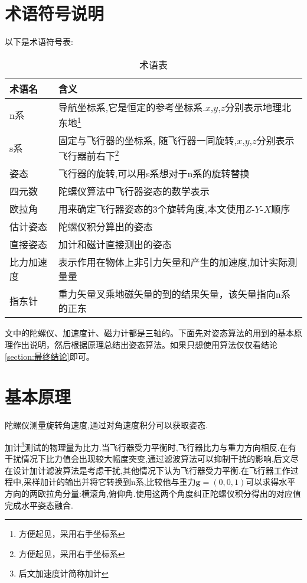 \documentclass[10pt,a4paper]{article}
\begin{document}
\section{术语符号说明} 
以下是术语符号表:
\begin{table}[!hbp]
\begin{center}
    \begin{tabular}{|l|l|}
        \hline
        术语名 & 含义 \\
        \hline
        n系 & 导航坐标系,它是恒定的参考坐标系.$x$,$y$,$z$分别表示地理北东地\footnote{方便起见，采用右手坐标系} \\
        \hline
        s系 & 固定与飞行器的坐标系, 随飞行器一同旋转,$x$,$y$,$z$分别表示飞行器前右下\footnote{方便起见，采用右手坐标系} \\
        \hline
        姿态 & 飞行器的旋转,可以用s系想对于n系的旋转替换 \\
        \hline
        四元数 & 陀螺仪算法中飞行器姿态的数学表示 \\
        \hline
        欧拉角 & 用来确定飞行器姿态的3个旋转角度,本文使用$Z$-$Y$-$X$顺序 \\
        \hline
        估计姿态 & 陀螺仪积分算出的姿态 \\
        \hline
        直接姿态 & 加计和磁计直接测出的姿态 \\
        \hline
        比力加速度 & 表示作用在物体上非引力矢量和产生的加速度,加计实际测量量 \\
        \hline
        指东针 & 重力矢量叉乘地磁矢量的到的结果矢量，该矢量指向n系的正东 \\
        \hline
    \end{tabular}
    \caption{术语表\label{术语表}}
\end{center}
\end{table}

文中的陀螺仪、加速度计、磁力计都是三轴的。下面先对姿态算法的用到的基本原理作出说明，然后根据原理总结出姿态算法。如果只想使用算法仅仅看结论\ref{section:最终结论}即可。
\newpage

\section{基本原理}
陀螺仪测量旋转角速度,通过对角速度积分可以获取姿态.

加计\footnote{后文加速度计简称加计}测试的物理量为比力.当飞行器受力平衡时,飞行器比力与重力方向相反.在有干扰情况下比力值会出现较大幅度突变,通过滤波算法可以抑制干扰的影响,后文尽在设计加计滤波算法是考虑干扰,其他情况下认为飞行器受力平衡.在飞行器工作过程中,采样加计的输出并将它转换到n系,比较他与重力$\mathbf{g}=(0,0,1)$可以求得水平方向的两欧拉角分量:横滚角,俯仰角.使用这两个角度纠正陀螺仪积分得出的对应值完成水平姿态融合.
\end{document}
